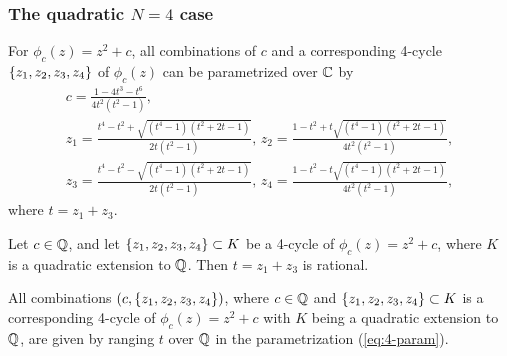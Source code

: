 \documentclass[aspectratio=1610]{beamer}
\begin{document}
\begin{frame}
  \frametitle{The quadratic $N = 4$ case}

  \pause

  \begin{proposition}
    For $\phi_c(z) = z^2 + c$, all combinations of $c$ and a
    corresponding 4-cycle $\left\{z_1, z_2, z_3, z_4\right\}$ of $\phi_c(z)$
    can be parametrized over $\mathbb{C}$ by
    \begin{equation}
      \label{eq:4-param}
      \begin{gathered}
        c = \frac{1 - 4t^3 - t^6}{4t^2(t^2 - 1)}, \\
        z_1 = \frac{t^4 - t^2 + \sqrt{(t^4 - 1)(t^2 + 2t - 1)}}{2t(t^2
          - 1)},\,
        z_2 = \frac{1 - t^2 + t \sqrt{(t^4 - 1)(t^2 + 2t -
            1)}}{4t^2(t^2 - 1)}, \\
        z_3 = \frac{t^4 - t^2 - \sqrt{(t^4 - 1)(t^2 + 2t - 1)}}{2t(t^2
          - 1)},\,
        z_4 = \frac{1 - t^2 - t \sqrt{(t^4 - 1)(t^2 + 2t -
            1)}}{4t^2(t^2 - 1)},
      \end{gathered}
    \end{equation}
    where $t = z_1 + z_3$.
  \end{proposition}

  \pause

  \begin{lemma}
    \label{lem:z1+z3}
    Let $c \in \mathbb{Q}$, and let $\left\{z_1, z_2, z_3, z_4\right\} \subset K$ be a
    4-cycle of $\phi_c(z) = z^2 + c$, where $K$ is a quadratic
    extension to $\mathbb{Q}$. Then $t = z_1 + z_3$ is rational.
  \end{lemma}

  \pause

  \begin{theorem} 
    \label{th:all}
    All combinations $(c, \left\{z_1, z_2, z_3, z_4\right\})$, where $c \in \mathbb{Q}$
    and $\left\{z_1, z_2, z_3, z_4\right\} \subset K$ is a corresponding
    4-cycle of $\phi_c(z) = z^2 + c$ with $K$ being a quadratic
    extension to $\mathbb{Q}$, are given by ranging $t$ over $\mathbb{Q}$ in the
    parametrization (\ref{eq:4-param}).
  \end{theorem}
\end{frame}
\end{document}
